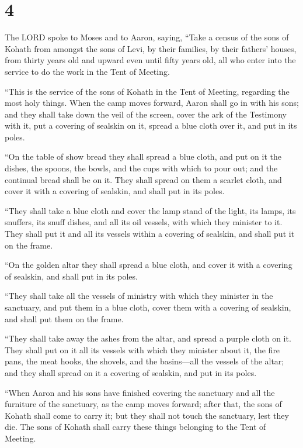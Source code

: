 \hypertarget{section-3}{%
\section{4}\label{section-3}}

 The LORD spoke to Moses and to Aaron, saying, 
``Take a census of the sons of Kohath from amongst the sons of Levi, by
their families, by their fathers' houses,  from thirty years
old and upward even until fifty years old, all who enter into the
service to do the work in the Tent of Meeting.

 ``This is the service of the sons of Kohath in the Tent of
Meeting, regarding the most holy things.  When the camp
moves forward, Aaron shall go in with his sons; and they shall take down
the veil of the screen, cover the ark of the Testimony with it,
 put a covering of sealskin on it, spread a blue cloth over
it, and put in its poles.

 ``On the table of show bread they shall spread a blue
cloth, and put on it the dishes, the spoons, the bowls, and the cups
with which to pour out; and the continual bread shall be on it.
 They shall spread on them a scarlet cloth, and cover it
with a covering of sealskin, and shall put in its poles.

 ``They shall take a blue cloth and cover the lamp stand of
the light, its lamps, its snuffers, its snuff dishes, and all its oil
vessels, with which they minister to it.  They shall put it
and all its vessels within a covering of sealskin, and shall put it on
the frame.

 ``On the golden altar they shall spread a blue cloth, and
cover it with a covering of sealskin, and shall put in its poles.

 ``They shall take all the vessels of ministry with which
they minister in the sanctuary, and put them in a blue cloth, cover them
with a covering of sealskin, and shall put them on the frame.

 ``They shall take away the ashes from the altar, and
spread a purple cloth on it.  They shall put on it all its
vessels with which they minister about it, the fire pans, the meat
hooks, the shovels, and the basins---all the vessels of the altar; and
they shall spread on it a covering of sealskin, and put in its poles.

 ``When Aaron and his sons have finished covering the
sanctuary and all the furniture of the sanctuary, as the camp moves
forward; after that, the sons of Kohath shall come to carry it; but they
shall not touch the sanctuary, lest they die. The sons of Kohath shall
carry these things belonging to the Tent of Meeting.

